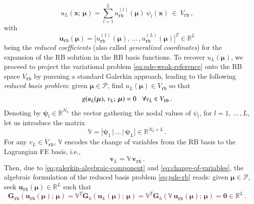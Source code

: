 \documentclass[longtitle]{elsarticle}
\numberwithin{equation}{section}
\theoremstyle{theorem}
\theoremstyle{definition}
\theoremstyle{remark}
\theoremstyle{proposition}
\numberwithin{figure}{section}
\newcommand{\bg}[1]{\boldsymbol{#1}}
\begin{document}
		\begin{equation*}
			u_{L}(\bg{x}; \, \bg{\mu}) = \sum_{l = 1}^L u_{\texttt{rb}}^{(l)}(\bg{\mu}) ~ \psi_l(\bg{x}) ~ \in ~ V_{\texttt{rb}} \, ,
		\end{equation*}
		with \[ \mathbf{u}_{\texttt{rb}}(\bg{\mu}) = \big[ u_{\texttt{rb}}^{(1)}(\bg{\mu}), \, \ldots \, , u_{\texttt{rb}}^{(L)}(\bg{\mu}) \big]^T \in \mathbb{R}^L \] being the \emph{reduced coefficients} (also called \emph{generalized coordinates}) for the expansion of the RB solution in the RB basis functions. To recover $u_L(\bg{\mu})$, we proceed to project the variational problem \eqref{eq:pde-weak-reference} onto the RB space $V_{\texttt{rb}}$ by pursuing a standard Galerkin approach, leading to the following \emph{reduced basis problem}: given $\bg{\mu} \in \mathcal{P}$, find $u_L(\bg{\mu}) \in V_{\texttt{rb}}$ so that
		\begin{equation}
			\label{eq:pde-rb}
			g(u_L(\bg{\mu}), \, v_L; \, \bg{\mu}) = 0 \hspace*{0.3cm} \forall v_L \in V_{\texttt{rb}} \, .
		\end{equation}
		Denoting by $\bg{\psi}_l \in \mathbb{R}^{N_h}$ the vector gathering the nodal values of $\psi_l$, for $l = 1, \, \ldots \, , L$, let us introduce the matrix
		\begin{equation*}
			\mathbb{V} = \big[ \bg{\psi}_1 \, \vert \, \ldots \, \vert \, \bg{\psi}_L \big] \in \mathbb{R}^{N_h \times L} \, .
		\end{equation*}
		For any $v_L \in V_{\texttt{rb}}$, $\mathbb{V}$ encodes the change of variables from the RB basis to the Lagrangian FE basis, i.e.,
		\begin{equation}
			\label{eq:change-of-variables}
			\mathbf{v}_L = \mathbb{V} \, \mathbf{v}_{\texttt{rb}} \, .
		\end{equation}
		Then, due to \eqref{eq:galerkin-algebraic-component} and \eqref{eq:change-of-variables}, the algebraic formulation of the reduced basis problem \eqref{eq:pde-rb} reads: given $\bg{\mu} \in \mathcal{P}$, seek $\mathbf{u}_{\texttt{rb}}(\bg{\mu}) \in \mathbb{R}^L$ such that
		\begin{equation}
			\label{eq:pde-rb-algebraic}
			\mathbf{G}_{\texttt{rb}}(\mathbf{u}_{\texttt{rb}}(\bg{\mu}); \, \bg{\mu}) = \mathbb{V}^T \mathbf{G}_h(\mathbf{u}_L(\bg{\mu}); \, \bg{\mu}) = \mathbb{V}^T \mathbf{G}_h(\mathbb{V} \, \mathbf{u}_{\texttt{rb}}(\bg{\mu}); \, \bg{\mu}) = \bg{0} \in \mathbb{R}^L \, . 
		\end{equation}
\end{document}
